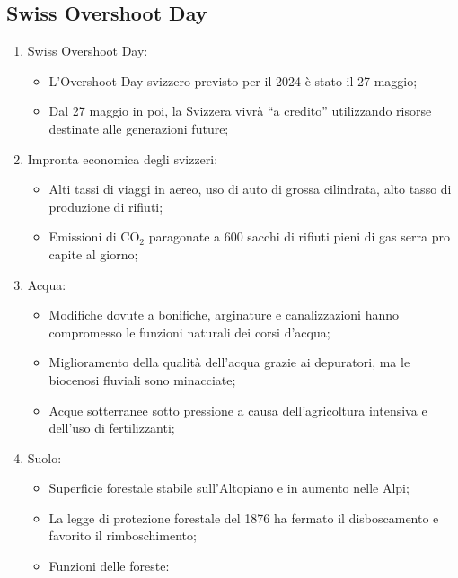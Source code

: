 \documentclass{article}
\begin{document}
\subsection{Swiss Overshoot Day}
\begin{enumerate}
    \item Swiss Overshoot Day:
        \begin{itemize}
            \item L'Overshoot Day svizzero previsto per il 2024 è stato il 27 maggio;
            \item Dal 27 maggio in poi, la Svizzera vivrà ``a credito'' utilizzando risorse
                destinate alle generazioni future;
        \end{itemize}
    \item Impronta economica degli svizzeri:
        \begin{itemize}
            \item Alti tassi di viaggi in aereo, uso di auto di grossa cilindrata, alto tasso
                di produzione di rifiuti;
            \item Emissioni di CO$_2$ paragonate a 600 sacchi di rifiuti pieni di gas serra
                pro capite al giorno;
        \end{itemize}
    \item Acqua:
        \begin{itemize}
            \item Modifiche dovute a bonifiche, arginature e canalizzazioni hanno compromesso
                le funzioni naturali dei corsi d'acqua;
            \item Miglioramento della qualità dell'acqua grazie ai depuratori, ma le biocenosi
                fluviali sono minacciate;
            \item Acque sotterranee sotto pressione a causa dell'agricoltura intensiva e
                dell'uso di fertilizzanti;
        \end{itemize}
    \item Suolo:
        \begin{itemize}
            \item Superficie forestale stabile sull'Altopiano e in aumento nelle Alpi;
            \item La legge di protezione forestale del 1876 ha fermato il disboscamento e
                favorito il rimboschimento;
            \item Funzioni delle foreste:
                \begin{itemize}

\end{itemize}
\end{itemize}
\end{enumerate}
\end{document}
